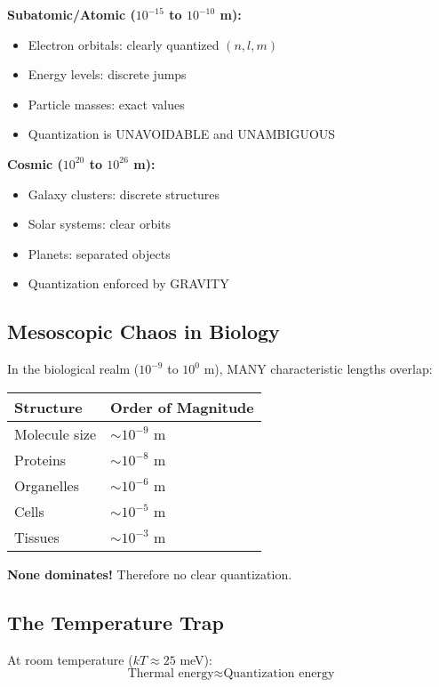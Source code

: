 \documentclass[12pt,a4paper]{article}
\begin{document}
	\textbf{Subatomic/Atomic ($10^{-15}$ to $10^{-10}$ m):}
	\begin{itemize}
		\item Electron orbitals: clearly quantized $(n, l, m)$
		\item Energy levels: discrete jumps
		\item Particle masses: exact values
		\item Quantization is UNAVOIDABLE and UNAMBIGUOUS
	\end{itemize}
	
	\textbf{Cosmic ($10^{20}$ to $10^{26}$ m):}
	\begin{itemize}
		\item Galaxy clusters: discrete structures
		\item Solar systems: clear orbits
		\item Planets: separated objects
		\item Quantization enforced by GRAVITY
	\end{itemize}
	
	\subsection{Mesoscopic Chaos in Biology}
	
	In the biological realm ($10^{-9}$ to $10^0$ m), MANY characteristic lengths overlap:
	
	\begin{center}
		\begin{tabular}{ll}
			\toprule
			Structure & Order of Magnitude\\
			\midrule
			Molecule size & $\sim 10^{-9}$ m\\
			Proteins & $\sim 10^{-8}$ m\\
			Organelles & $\sim 10^{-6}$ m\\
			Cells & $\sim 10^{-5}$ m\\
			Tissues & $\sim 10^{-3}$ m\\
			\bottomrule
		\end{tabular}
	\end{center}
	
	\textbf{None dominates!} Therefore no clear quantization.
	
	\subsection{The Temperature Trap}
	
	At room temperature ($kT \approx 25$ meV):
	\begin{equation}
		\text{Thermal energy} \approx \text{Quantization energy}
	\end{equation}
	
\end{document}
